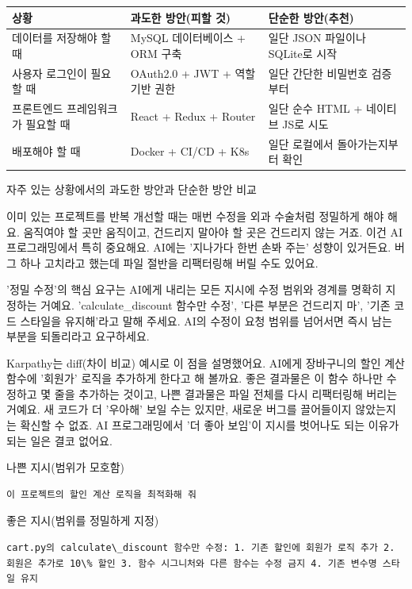 \begin{center}
\begin{tabularx}{\linewidth}{|X|X|X|}
\hline
\textbf{상황} & \textbf{과도한 방안(피할 것)} & \textbf{단순한 방안(추천)} \tabularnewline
\hline
데이터를 저장해야 할 때 & MySQL 데이터베이스 + ORM 구축 & 일단 JSON 파일이나 SQLite로 시작 \tabularnewline
사용자 로그인이 필요할 때 & OAuth2.0 + JWT + 역할 기반 권한 & 일단 간단한 비밀번호 검증부터 \tabularnewline
프론트엔드 프레임워크가 필요할 때 & React + Redux + Router & 일단 순수 HTML + 네이티브 JS로 시도 \tabularnewline
배포해야 할 때 & Docker + CI/CD + K8s & 일단 로컬에서 돌아가는지부터 확인 \tabularnewline
\hline
\end{tabularx}
\end{center}

\begin{center}\small\color{gray}자주 있는 상황에서의 과도한 방안과 단순한 방안 비교\end{center}


이미 있는 프로젝트를 반복 개선할 때는 매번 수정을 외과 수술처럼 정밀하게 해야 해요. 움직여야 할 곳만 움직이고, 건드리지 말아야 할 곳은 건드리지 않는 거죠. 이건 AI 프로그래밍에서 특히 중요해요. AI에는 '지나가다 한번 손봐 주는' 성향이 있거든요. 버그 하나 고치라고 했는데 파일 절반을 리팩터링해 버릴 수도 있어요.

'정밀 수정'의 핵심 요구는 AI에게 내리는 모든 지시에 수정 범위와 경계를 명확히 지정하는 거예요. 'calculate\_discount 함수만 수정', '다른 부분은 건드리지 마', '기존 코드 스타일을 유지해'라고 말해 주세요. AI의 수정이 요청 범위를 넘어서면 즉시 남는 부분을 되돌리라고 요구하세요.

Karpathy는 diff(차이 비교) 예시로 이 점을 설명했어요. AI에게 장바구니의 할인 계산 함수에 '회원가' 로직을 추가하게 한다고 해 볼까요. 좋은 결과물은 이 함수 하나만 수정하고 몇 줄을 추가하는 것이고, 나쁜 결과물은 파일 전체를 다시 리팩터링해 버리는 거예요. 새 코드가 더 '우아해' 보일 수는 있지만, 새로운 버그를 끌어들이지 않았는지는 확신할 수 없죠. AI 프로그래밍에서 '더 좋아 보임'이 지시를 벗어나도 되는 이유가 되는 일은 결코 없어요.

나쁜 지시(범위가 모호함)

\begin{lstlisting}
이 프로젝트의 할인 계산 로직을 최적화해 줘
\end{lstlisting}

좋은 지시(범위를 정밀하게 지정)

\begin{lstlisting}
cart.py의 calculate\_discount 함수만 수정: 1. 기존 할인에 회원가 로직 추가 2. 회원은 추가로 10\% 할인 3. 함수 시그니처와 다른 함수는 수정 금지 4. 기존 변수명 스타일 유지
\end{lstlisting}

